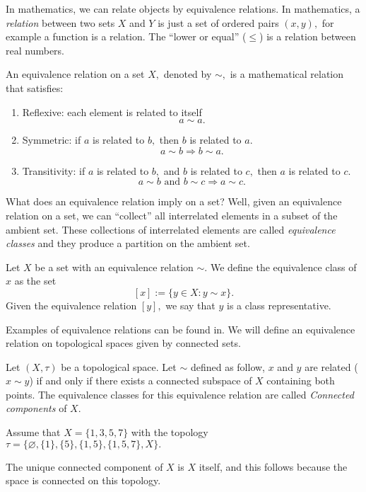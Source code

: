 \documentclass[
	fontsize=10pt, %
	twoside=false, %
	secnumdepth=1, %
]{kaobook}
\begin{document}
In mathematics, we can relate objects by equivalence relations. In mathematics, a \emph{relation} between two sets $X$ and $Y$ is just a set of ordered pairs $(x,y),$ for example a function is a relation. The ``lower or equal'' ($\leq$) is a relation between real numbers.

\begin{definition}
An equivalence relation on a set $X,$ denoted by $\sim,$ is a mathematical relation that satisfies:
\begin{enumerate}
\item Reflexive: each element is related to itself $$a\sim a.$$

\item Symmetric: if $a$ is related to $b,$ then $b$ is related to $a.$ $$a\sim b\Rightarrow b\sim a.$$

\item Transitivity: if $a$ is related to $b,$ and $b$ is related to $c,$ then $a$ is related to $c.$ $$a\sim b \mbox{ and }b\sim c\Rightarrow a\sim c.$$
\end{enumerate}
\end{definition}

What does an equivalence relation imply on a set? Well, given an equivalence relation on a set, we can ``collect'' all interrelated elements in a subset of the ambient set. These collections of interrelated elements are called \emph{equivalence classes} and they produce a partition on the ambient set.

\begin{definition}
Let $X$ be a set with an equivalence relation $\sim.$ We define the equivalence class of $x$ as the set $$[x]:=\{y\in X: y\sim x\}.$$
Given the equivalence relation $[y],$ we say that $y$ is a class representative. 
\end{definition}
Examples of equivalence relations can be found in.
We will define an equivalence relation on topological spaces given by connected sets.
\begin{definition}
Let $(X,\tau)$ be a topological space. Let $\sim$ defined as follow, $x$ and $y$ are related ($x\sim y$) if and only if there exists a connected subspace of $X$ containing both points. 
The equivalence classes for this equivalence relation are called \emph{Connected components} of $X.$
\end{definition}
\begin{example}
Assume that $X=\{1,3,5,7\}$ with the topology $\tau=\{\varnothing,\{1\},\{5\},\{1,5\},\{1,5,7\},X\}.$ 

The unique connected component of $X$ is $X$ itself, and this follows because the space is connected on this topology.
\end{example}
\end{document}
